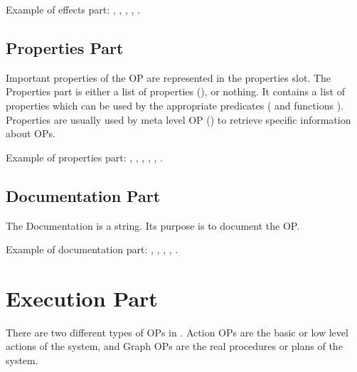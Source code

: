 Example of effects part: \*
\code{()}, \*
, \*
, \*
, \*
.

\subsection{Properties Part}

Important properties of the OP are represented in the properties slot. The
Properties part is either a list of properties (), or
nothing. It contains a list of properties which can be used by the appropriate
predicates ( and functions
). Properties are usually used
by meta level OP () to retrieve specific information about OPs.

Example of properties part: \*
\code{()}, \*
, \*
, \*
, \*
, \*
.

\subsection{Documentation Part}

The Documentation is a string. Its purpose is to document the OP.

Example of documentation part: \*
, \*
, \*
,
\*
, \*
.

\section{Execution Part}

There are two different types of OPs in \COPRS{}. Action OPs are the
basic or low level actions of the system, and Graph OPs are the real
procedures or plans of the system.



